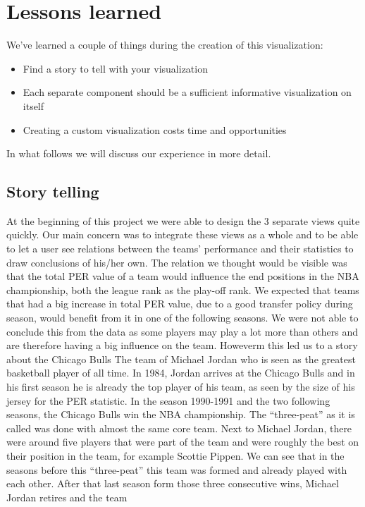 \documentclass[]{sigchi}
\begin{document}
\section{Lessons learned}\label{sec:lessonslearned}
We've learned a couple of things during the creation of this visualization:
\begin{itemize}
    \item Find a story to tell with your visualization
    \item Each separate component should be a sufficient informative visualization on itself
    \item Creating a custom visualization costs time and opportunities
\end{itemize}
In what follows we will discuss our experience in more detail.

\subsection{Story telling}
At the beginning of this project we were able to design the 3 separate views
quite quickly. Our main concern was to integrate these views as a whole and to be 
able to let a user see relations between the teams' performance and their statistics to draw
conclusions of his/her own. The relation we thought would be visible 
was that the total PER value of a team would influence the end positions in the NBA championship, both the league rank as the play-off rank. We expected that teams 
that had a big increase in total PER value, due to a good transfer policy during 
season, would benefit from it in one of the following seasons. We were not able to conclude this from the data as some players may play a lot more than others and are therefore having a big influence on the team. Howeverm this led us to a story about 
the Chicago Bulls The team of Michael Jordan who is seen as the greatest basketball 
player of all time. In 1984, Jordan arrives at the Chicago Bulls and in his first season he is already the top player of his team, as seen by the size of his jersey for the PER statistic. In the season 1990-1991 and the two following seasons, the 
Chicago Bulls win the NBA championship. The ``three-peat'' as it is called was done 
with almost the same core team. Next to Michael Jordan, there were around five 
players that were part of the team and were roughly the best on their position in 
the team, for example Scottie Pippen. We can see that in the seasons before this 
``three-peat'' this team was formed and already played with each other. After that 
last season form those three consecutive wins, Michael Jordan retires and the team 
\end{document}
